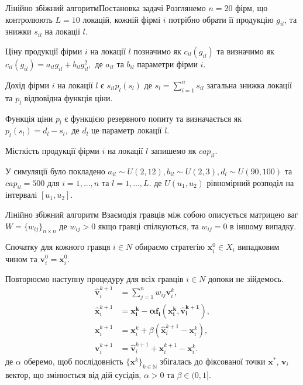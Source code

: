 \documentclass[unicode]{beamer}
\begin{document}
\begin{frame}{Лінійно збіжний алгоритм}{Постановка задачі}
    Розглянемо $n = 20$ фірм, що контролюють $L = 10$ локацій, кожній фірмі $i$ потрібно обрати її продукцію $g_{il}$, та знижки $s_{il}$ на локації $l$.

Ціну продукції фірми $i$ на локації $l$ позначимо як $c_{il}(g_{il})$ та визначимо як
$c_{il}(g_{il}) = a_{il}g_{il} + b_{il}g_{il}^2,$ де $a_{il}$ та $b_{il}$ параметри фірми $i$.

Дохід фірми $i$ на локації $l$ є $s_{il}p_{l}(s_l)$ де $s_l = \sum_{i=1}^{n} s_{il}$ загальна знижка локації та $p_{l}$ відповідна функція ціни.

Функція ціни $p_l$ є функцією резервного попиту та визначається як $p_l(s_l) = d_l - s_l,$ де $d_l$ це параметр локації $l$.

Місткість продукції фірми $i$ на локації $l$ запишемо як $cap_{il}$.

У симуляції було покладено $a_{il} \sim U(2,12), b_{il} \sim U(2,3), d_l \sim U(90,100)$ та $cap_{il} = 500$ для $i = 1, ..., n$ та $l = 1, ..., L.$ де $U(u_1,u_2)$ рівномірний розподіл на інтервалі $[u_1, u_2]$.

\end{frame}

\begin{frame}{Лінійно збіжний алгоритм}
Взаємодія гравців між собою описується матрицею ваг $W = \{w_{ij}\}_{n\times n}$ де $w_{ij} > 0$ якщо гравці спілкуються, та $w_{ij} = 0$ в іншому випадку.

Спочатку для кожного гравця $i \in N$ обираємо стратегію $\mathbf{x}_i^0 \in X_i$ випадковим чином та $\mathbf{v}_i^0=\mathbf{x}_i^0$.

Повторюємо наступну процедуру для всіх гравців $i \in N$ допоки не зійдемось. 
\begin{align}
\mathbf{\hat{v}}^{k+1}_i &= \sum_{j=1}^{n} w_{ij}\mathbf{v}^k_i,\\
\mathbf{\hat{x}}^{k+1}_i &= \mathbf{x_i^k-\alpha f_i\left(\mathbf{x_i^k},\mathbf{\hat{v}}^{k+1}_i\right)},\\
\mathbf{x}^{k+1}_i &= \mathbf{x}^{k}_i + \beta\left(\mathbf{\hat{x}}^{k+1}_i-\mathbf{x}^{k}_i\right),\\
\mathbf{v}^{k+1}_i &= \mathbf{\hat{v}}^{k+1}_i + \mathbf{x}^{k+1}_i-\mathbf{x}^{k}_i.
\end{align}
де $\alpha$ оберемо, щоб послідовність $\{\mathbf{x}^k\}_{k\in \mathbb{N}}$ збігалась до фіксованої точки $\mathbf{x}^*$, $\mathbf{v}_i$ вектор, що змінюється від дій сусідів, $\alpha > 0$ та $\beta \in (0,1]$.

\end{frame}
\end{document}
